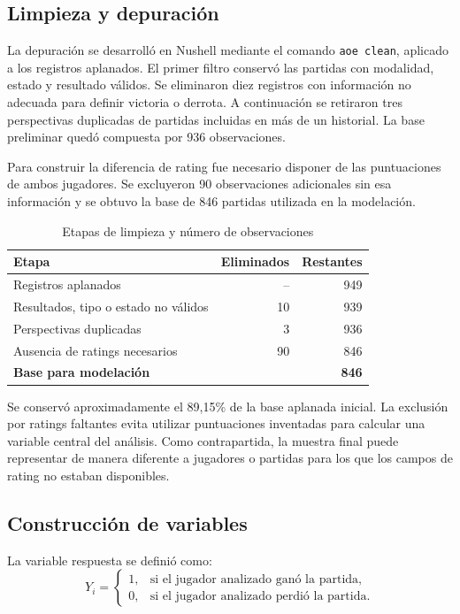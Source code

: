 \documentclass[12pt,a4paper]{article}
\begin{document}
\subsection{Limpieza y depuración}

La depuración se desarrolló en Nushell mediante el comando \texttt{aoe clean}, aplicado a los registros aplanados. El primer filtro conservó las partidas con modalidad, estado y resultado válidos. Se eliminaron diez registros con información no adecuada para definir victoria o derrota. A continuación se retiraron tres perspectivas duplicadas de partidas incluidas en más de un historial. La base preliminar quedó compuesta por 936 observaciones.

Para construir la diferencia de rating fue necesario disponer de las puntuaciones de ambos jugadores. Se excluyeron 90 observaciones adicionales sin esa información y se obtuvo la base de 846 partidas utilizada en la modelación.

\begin{table}[htbp]
\centering
\caption{Etapas de limpieza y número de observaciones}
\label{tab:limpieza}
\begin{tabular}{lrr}
\toprule
\textbf{Etapa} & \textbf{Eliminados} & \textbf{Restantes}\\
\midrule
Registros aplanados & -- & 949\\
Resultados, tipo o estado no válidos & 10 & 939\\
Perspectivas duplicadas & 3 & 936\\
Ausencia de ratings necesarios & 90 & 846\\
\midrule
\textbf{Base para modelación} & & \textbf{846}\\
\bottomrule
\end{tabular}
\end{table}

Se conservó aproximadamente el 89,15\% de la base aplanada inicial. La exclusión por ratings faltantes evita utilizar puntuaciones inventadas para calcular una variable central del análisis. Como contrapartida, la muestra final puede representar de manera diferente a jugadores o partidas para los que los campos de rating no estaban disponibles.

\subsection{Construcción de variables}

La variable respuesta se definió como:
\begin{equation}
Y_i=\begin{cases}
1, & \text{si el jugador analizado ganó la partida},\\
0, & \text{si el jugador analizado perdió la partida}.
\end{cases}
\end{equation}
\end{document}
